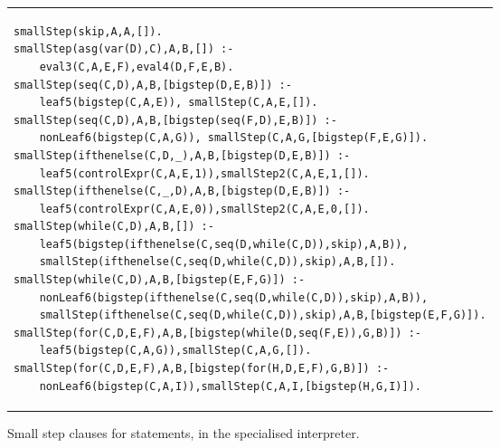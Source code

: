 \documentclass{llncs}
\begin{document}
\begin{figure}
\begin{tabular}{l}
\begin{lstlisting}
smallStep(skip,A,A,[]).
smallStep(asg(var(D),C),A,B,[]) :- 
    eval3(C,A,E,F),eval4(D,F,E,B).
smallStep(seq(C,D),A,B,[bigstep(D,E,B)]) :-
    leaf5(bigstep(C,A,E)), smallStep(C,A,E,[]).
smallStep(seq(C,D),A,B,[bigstep(seq(F,D),E,B)]) :-
    nonLeaf6(bigstep(C,A,G)), smallStep(C,A,G,[bigstep(F,E,G)]).
smallStep(ifthenelse(C,D,_),A,B,[bigstep(D,E,B)]) :-
    leaf5(controlExpr(C,A,E,1)),smallStep2(C,A,E,1,[]).
smallStep(ifthenelse(C,_,D),A,B,[bigstep(D,E,B)]) :-
    leaf5(controlExpr(C,A,E,0)),smallStep2(C,A,E,0,[]).
smallStep(while(C,D),A,B,[]) :-
    leaf5(bigstep(ifthenelse(C,seq(D,while(C,D)),skip),A,B)),
    smallStep(ifthenelse(C,seq(D,while(C,D)),skip),A,B,[]).
smallStep(while(C,D),A,B,[bigstep(E,F,G)]) :-
    nonLeaf6(bigstep(ifthenelse(C,seq(D,while(C,D)),skip),A,B)),
    smallStep(ifthenelse(C,seq(D,while(C,D)),skip),A,B,[bigstep(E,F,G)]).
smallStep(for(C,D,E,F),A,B,[bigstep(while(D,seq(F,E)),G,B)]) :-
    leaf5(bigstep(C,A,G)),smallStep(C,A,G,[]).
smallStep(for(C,D,E,F),A,B,[bigstep(for(H,D,E,F),G,B)]) :-
    nonLeaf6(bigstep(C,A,I)),smallStep(C,A,I,[bigstep(H,G,I)]).

\end{lstlisting}
\end{tabular}
\caption{Small step clauses for statements, in the specialised interpreter.}\label{small-step-while}
\end{figure}
\end{document}
